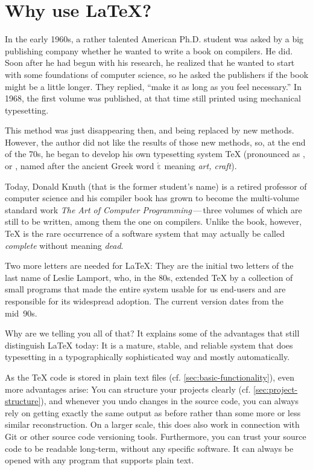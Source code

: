 \chapter{Why use \LaTeX?}
\label{sec:why-uses-latex}

In the early 1960s, a rather talented American Ph.D. student was asked by a big publishing company whether he wanted to write a book on compilers.
He did.
Soon after he had begun with his research, he realized that he wanted to start with some foundations of computer science, so he asked the publishers if the book might be a little longer.
They replied, \enquote{make it as long as you feel necessary.}
In 1968, the first volume was published, at that time still printed using mechanical typesetting.

This method was just disappearing then, and being replaced by new methods.
However, the author did not like the results of those new methods, so,
at the end of the 70s, he began to develop his own typesetting system \TeX{}
(pronounced as \textipa{[tEx]}, \textipa{[tE\c{c}]} or \textipa{[tEk]}, named after the ancient Greek word \texttau$\mathrm{\acute{\varepsilon}}$\textchi\textnu\texteta{} \textipa{['tExnE:]} meaning \emph{art, craft}).

Today, Donald Knuth (that is the former student’s name) is a retired professor of computer science and his compiler book has grown to become the multi-volume standard work \emph{The Art of Computer Programming}\,—\,three volumes of which are still to be written, among them the one on compilers.
Unlike the book, however, \TeX{} is the rare occurrence of a software system that may actually be called \emph{complete} without meaning \emph{dead}.

Two more letters are needed for \LaTeX:
They are the initial two letters of the last name of Leslie Lamport, who, in the 80s, extended \TeX{} by a collection of small programs that made the entire system usable for us end-users and are responsible for its widespread adoption.
The current version dates from the mid~90s.

Why are we telling you all of that?
It explains some of the advantages that still distinguish \LaTeX{} today:
It is a mature, stable, and reliable system
that does typesetting in a typographically sophisticated way and mostly automatically.

As the \TeX{} code is stored in plain text files (cf. \cref{sec:basic-functionality}),
even more advantages arise:
You can structure your projects clearly (cf. \cref{sec:project-structure}),
and whenever you undo changes in the source code, you can always rely on getting exactly the same output as before
rather than some more or less similar reconstruction.
On a larger scale, this does also work in connection with Git or other source code versioning tools.
Furthermore, you can trust your source code to be readable long-term, without any specific software.
It can always be opened with any program that supports plain text.

